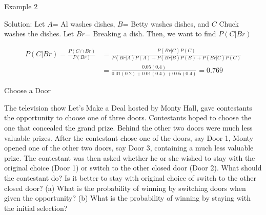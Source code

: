 \documentclass[
  ignorenonframetext,
]{beamer}
\begin{document}
\begin{frame}{Example 2}
\protect\hypertarget{example-2-1}{}
\begin{tcolorbox}
Solution:  Let $A$= Al washes dishes, $B$= Betty washes dishes, and $C$ Chuck washes the dishes. Let $Br$= Breaking a dish. Then, we want to find $P(C|Br)$

$$\begin{array}{ll}
P(C|Br)=\frac{P(C\cap Br)}{P(Br)}&=\frac{P(Br|C)P(C)}{P(Br|A)P(A)+P(Br|B)P(B)+P(Br|C)P(C)}\\
&=\frac{0.05(0.4)}{0.01(0.2)+0.01(0.4)+0.05(0.4)}=0.769\end{array}$$
\end{tcolorbox}
\end{frame}

\begin{frame}{Choose a Door}
\protect\hypertarget{choose-a-door}{}
\begin{tcolorbox}
The television show Let's Make a Deal hosted by Monty Hall, gave contestants the opportunity to choose one of three doors. Contestants hoped to choose the one that concealed the grand prize. Behind the other two doors were much less valuable prizes. After the contestant chose one of the doors, say Door 1, Monty opened one of the other two doors, say Door 3, containing a much less valuable prize. The contestant was then asked whether he or she wished to stay with the original choice (Door 1) or switch to the other closed door (Door 2). What should the contestant do? Is it better to stay with original choice of switch to the other closed door? (a) What is the probability of winning by switching doors when given the opportunity? (b) What is the probability of winning by staying with the initial selection?


\end{tcolorbox}
\end{frame}
\end{document}
